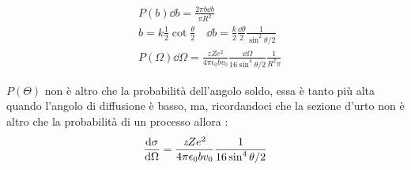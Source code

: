 \begin{align*}
    &P(b)\dd{b} = \frac{2\pi b\dd{b}}{\pi R^2} \\[1em]
    &b = k\frac{1}{2}\cot{\frac{\theta}{2}} \quad \dd{b} = \frac{k}{2}\frac{\dd{\theta}}{2}\frac{1}{\sin^2{\theta/2}} \\[1em]
    &P(\Omega)\dd{\Omega} = \frac{\textit{z}Ze^2}{4\pi\epsilon_{0}bv_{0}}\frac{\dd{\Omega}}{16\sin^4{\theta/2}}\frac{1}{R^2\pi}
\end{align*}

$P(\Theta)$ non è altro che la probabilità dell'angolo soldo, essa è tanto più alta quando l'angolo di diffusione è basso, 
ma, ricordandoci che la sezione d'urto non è altro che la probabilità di un processo allora : 
\begin{align*}
        \dv{\sigma}{\Omega} = \frac{\textit{z}Ze^2}{4\pi\epsilon_{0}bv_{0}}\frac{1}{16\sin^4{\theta/2}}
\end{align*}
